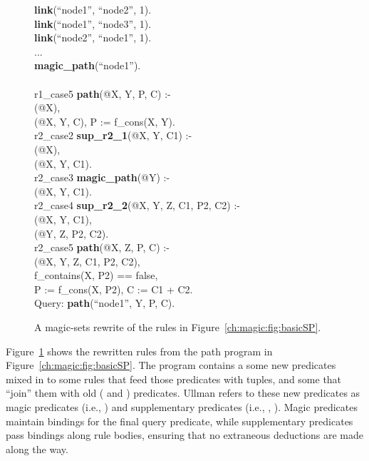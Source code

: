 \begin{figure}[!t]
\ssp
\begin{boxedminipage}{\linewidth}
{\bf link}(``node1'', ``node2'', 1).\\
{\bf link}(``node1'', ``node3'', 1).\\
{\bf link}(``node2'', ``node1'', 1).\\
...\\
{\bf magic\_path}(``node1''). \\
\\
r1\_case5 {\bf path}(@X, Y, P, C) :- \\
(@X), \\
(@X, Y, C), P := f\_cons(X, Y).\\

r2\_case2 {\bf sup\_r2\_1}(@X, Y, C1) :- \\
(@X), \\
(@X, Y, C1). \\

r2\_case3 {\bf magic\_path}(@Y) :- \\
(@X, Y, C1). \\

r2\_case4 {\bf sup\_r2\_2}(@X, Y, Z, C1, P2, C2) :- \\
(@X, Y, C1), \\
(@Y, Z, P2, C2). \\

r2\_case5 {\bf path}(@X, Z, P, C) :- \\
(@X, Y, Z, C1, P2, C2), \\
\datalogspace f\_contains(X, P2) == false, \\
\datalogspace P := f\_cons(X, P2), C := C1 + C2. \\

Query: {\bf path}(``node1'', Y, P, C).
\end{boxedminipage}
\caption{\label{ch:magic:fig:magicSP}A magic-sets rewrite of 
the rules in Figure~\ref{ch:magic:fig:basicSP}.}
\end{figure}

Figure~\ref{ch:magic:fig:magicSP} shows the rewritten rules from the path
program in Figure~\ref{ch:magic:fig:basicSP}.  The program contains a some new
predicates mixed in to some rules that feed those predicates with tuples, and
some that ``join'' them with old ( and ) predicates.  Ullman
refers to these new predicates as magic predicates (i.e., ) and
supplementary predicates (i.e., , ).  Magic
predicates maintain bindings for the final query predicate, while supplementary
predicates pass bindings along rule bodies, ensuring that no extraneous
deductions are made along the way.

